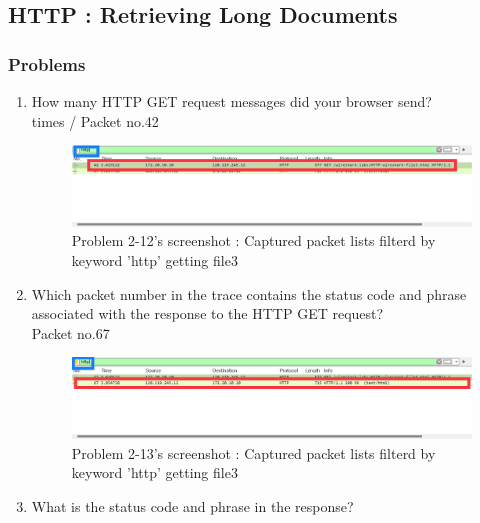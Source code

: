 \subsection{HTTP : Retrieving Long Documents}
    \subsubsection*{Problems}
    \begin{enumerate}[label=\bfseries Problem \arabic*:,leftmargin=*,labelindent=1em]\addtocounter{enumi}{11}
        \item How many HTTP GET request messages did your browser send? \\[0.2mm]
             times / Packet no.42
            \begin{figure}[!h]\centering
            \hspace{10mm} 
        		\includegraphics[width=.78\textwidth]{image/result_week01/Q2-c.png}
        		\caption{\footnotesize Problem 2-12's screenshot : Captured packet lists filterd by keyword 'http' getting file3}
        		\vspace{-10pt}
            \end{figure}   
        \item Which packet number in the trace contains the status code and phrase associated with the response to the HTTP GET request?\\[0.2mm]
            \soln  Packet no.67 
            \begin{figure}[!h]\centering
            \hspace{10mm} 
        		\includegraphics[width=.78\textwidth]{image/result_week01/Q2-d.png}
        		\caption{\footnotesize Problem 2-13's screenshot : Captured packet lists filterd by keyword 'http' getting file3}
        		\vspace{-10pt}
            \end{figure}            
        \item What is the status code and phrase in the response?\\[0.2mm]

\end{enumerate}
